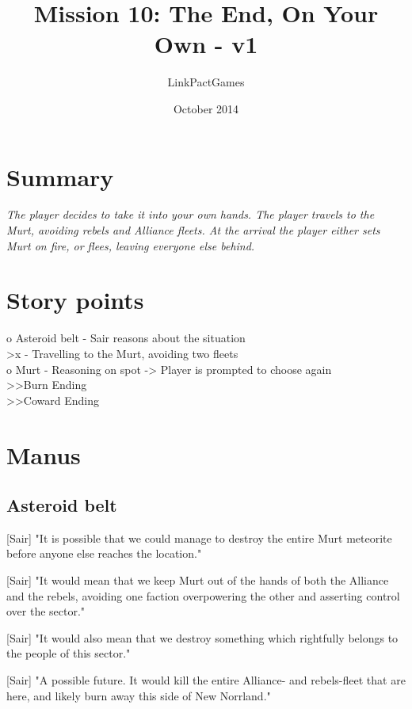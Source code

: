 \documentclass[a4paper,12pt]{article}
\begin{document}
\title{Mission 10: The End, On Your Own - v1}
\author{LinkPactGames}
\date{October 2014}
\maketitle

\section{Summary}

\textit{The player decides to take it into your own hands. The player travels to the Murt, avoiding
rebels and Alliance fleets. At the arrival the player either sets Murt on fire, or flees, leaving everyone else behind.}

\section{Story points}

o Asteroid belt - Sair reasons about the situation\\
\textgreater x - Travelling to the Murt, avoiding two fleets\\
o Murt - Reasoning on spot -> Player is prompted to choose again\\
\textgreater \textgreater Burn Ending\\
\textgreater \textgreater Coward Ending

\section{Manus}

\subsection{Asteroid belt}

[Sair] "It is possible that we could manage to destroy the entire Murt meteorite before anyone else
reaches the location."

[Sair] "It would mean that we keep Murt out of the hands of both the Alliance and the rebels, avoiding one faction
overpowering the other and asserting control over the sector."

[Sair] "It would also mean that we destroy something which rightfully belongs to the people of this sector."

[Sair] "A possible future. It would kill the entire Alliance- and rebels-fleet that are here, and likely burn away this side of New Norrland."
\end{document}
